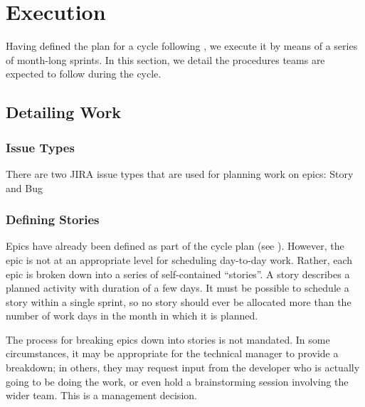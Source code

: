 \section{Execution} \label{sec:execution}

Having defined the plan for a \gls{cycle} following , we execute it by means of a series of month-long sprints.
In this section, we detail the procedures teams are expected to follow during the \gls{cycle}.

\subsection{Detailing Work}
\label{sec:detailing-work}

\subsubsection{Issue Types}\label{issue-types}

There are two \gls{JIRA} issue types that are used for planning work on epics: Story and Bug

\subsubsection{Defining Stories}
\label{sec:defining-stories}

Epics have already been defined as part of the \gls{cycle} plan (see ).
However, the \gls{epic} is not at an appropriate level for scheduling day-to-day work.
Rather, each \gls{epic} is broken down into a series of self-contained ``stories''.
A \gls{story} describes a planned activity with duration of a few days.
It must be possible to schedule a \gls{story} within a single sprint, so no \gls{story} should ever be allocated more than the number of work days in the month in which it is planned.

The process for breaking \glspl{epic} down into stories is not mandated. In
some circumstances, it may be appropriate for the technical manager to
provide a breakdown; in others, they may request input from the
developer who is actually going to be doing the work, or even hold a
brainstorming session involving the wider team. This is a management
decision.

